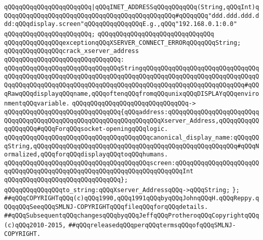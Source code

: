 \verb|qQQqqQQqqQQqqQQqqQQqqQQq|\verb#|qQQqINET_ADDRESSqQQqqQQqqQQq(String,qQQqInt)qQQqqQQqqQQqqQQqqQQqqQQqqQQqqQQqqQQqqQQqqQQqqQQq#\verb|#qQQqqQQq"ddd.ddd.ddd.ddd:qQQqdisplay.screen"qQQqqQQqqQQqqQQqE.g.,qQQq"192.168.0.1:0.0"|\newline
\verb|qQQqqQQqqQQqqQQqqQQqqQQq;|\newline
\verb|qQQqqQQqqQQqqQQqqQQqqQQqqQQqqQQq|\newline
\verb|qQQqqQQqqQQqqQQqexceptionqQQqXSERVER_CONNECT_ERRORqQQqqQQqString;|\newline
\newline
\verb|qQQqqQQqqQQqqQQqcrack_xserver_address|\newline
\verb|qQQqqQQqqQQqqQQqqQQqqQQqqQQqqQQq:|\newline
\verb|qQQqqQQqqQQqqQQqqQQqqQQqqQQqqQQqStringqQQqqQQqqQQqqQQqqQQqqQQqqQQqqQQqqQQqqQQqqQQqqQQqqQQqqQQqqQQqqQQqqQQqqQQqqQQqqQQqqQQqqQQqqQQqqQQqqQQqqQQqqQQqqQQqqQQqqQQqqQQqqQQqqQQqqQQqqQQqqQQqqQQqqQQqqQQqqQQqqQQqqQQq#qQQqRawqQQqdisplayqQQqname,qQQqoftenqQQqfromqQQqunixqQQqDISPLAYqQQqenvironmentqQQqvariable.|\newline
\verb|qQQqqQQqqQQqqQQqqQQqqQQqqQQqqQQq->|\newline
\verb|qQQqqQQqqQQqqQQqqQQqqQQqqQQqqQQq{qQQqaddress:qQQqqQQqqQQqqQQqqQQqqQQqqQQqqQQqqQQqqQQqqQQqqQQqqQQqqQQqqQQqqQQqqQQqXserver_Address,qQQqqQQqqQQqqQQqqQQq#qQQqForqQQqsocket-openingqQQqlogic.|\newline
\verb|qQQqqQQqqQQqqQQqqQQqqQQqqQQqqQQqqQQqqQQqcanonical_display_name:qQQqqQQqString,qQQqqQQqqQQqqQQqqQQqqQQqqQQqqQQqqQQqqQQqqQQqqQQqqQQqqQQq#qQQqNormalized,qQQqforqQQqdisplayqQQqtoqQQqhumans.|\newline
\verb|qQQqqQQqqQQqqQQqqQQqqQQqqQQqqQQqqQQqqQQqscreen:qQQqqQQqqQQqqQQqqQQqqQQqqQQqqQQqqQQqqQQqqQQqqQQqqQQqqQQqqQQqqQQqqQQqqQQqInt|\newline
\verb|qQQqqQQqqQQqqQQqqQQqqQQqqQQqqQQq};|\newline
\newline
\verb|qQQqqQQqqQQqqQQqto_string:qQQqXserver_AddressqQQq->qQQqString;|\newline
\verb|};|\newline
\newline
\newline
\newline
\verb|##qQQqCOPYRIGHTqQQq(c)qQQq1990,qQQq1991qQQqbyqQQqJohnqQQqH.qQQqReppy.qQQqqQQqSeeqQQqSMLNJ-COPYRIGHTqQQqfileqQQqforqQQqdetails.|\newline
\verb|##qQQqSubsequentqQQqchangesqQQqbyqQQqJeffqQQqProtheroqQQqCopyrightqQQq(c)qQQq2010-2015,|\newline
\verb|##qQQqreleasedqQQqperqQQqtermsqQQqofqQQqSMLNJ-COPYRIGHT.|\newline

